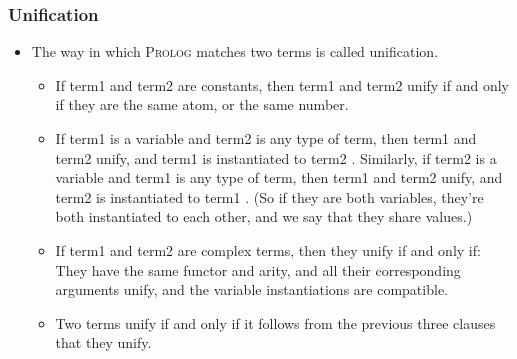 \documentclass[hideothersubsections, t, aspectratio=1610]{beamer}
\newcommand{\progLang}[1]{\textsc{#1}}
\begin{document}
\begin{frame}
\frametitle{Unification}
\begin{itemize}
\item The way in which \progLang{Prolog} matches two terms is called unification. 
\begin{itemize}
\item If term1 and term2 are constants, then term1 and term2 unify if and only if they are the same atom, or the same number.

\item If term1 is a variable and term2 is any type of term, then term1 and term2 unify, and term1 is instantiated to term2 . Similarly, if term2 is a variable and term1 is any type of term, then term1 and term2 unify, and term2 is instantiated to term1 . (So if they are both variables, they’re both instantiated to each other, and we say that they share values.)

\item If term1 and term2 are complex terms, then they unify if and only if:
They have the same functor and arity, and
all their corresponding arguments unify, and
the variable instantiations are compatible.

\item Two terms unify if and only if it follows from the previous three clauses that they unify.
\end{itemize}

\end{itemize}
\end{frame}


\end{document}
